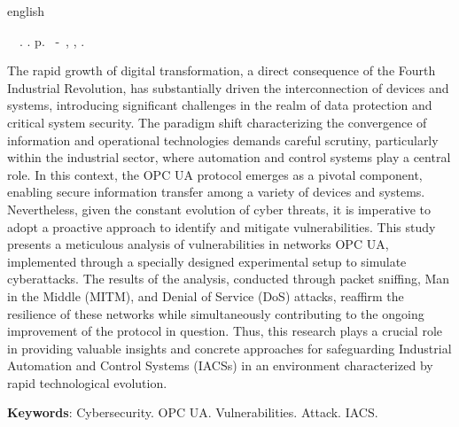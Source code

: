 \begin{resumo}[Abstract]
 \begin{otherlanguage*}{english}
	\begin{flushleft} 
		\setlength{\absparsep}{0pt} %
 		\SingleSpacing  		\imprimirautorabr~~\textbf{\imprimirtitleabstract}.	\imprimirdata.  \pageref{LastPage}p. 
		\imprimirtipotrabalhoabs~-~\imprimirinstituicao, \imprimirlocal, 	\imprimirdata. 
 	\end{flushleft}
	\OnehalfSpacing 
   The rapid growth of digital transformation, a direct consequence of the Fourth Industrial Revolution, has substantially driven the interconnection of devices and systems, introducing significant challenges in the realm of data protection and critical system security. The paradigm shift characterizing the convergence of information and operational technologies demands careful scrutiny, particularly within the industrial sector, where automation and control systems play a central role. In this context, the OPC UA protocol emerges as a pivotal component, enabling secure information transfer among a variety of devices and systems. Nevertheless, given the constant evolution of cyber threats, it is imperative to adopt a proactive approach to identify and mitigate vulnerabilities. This study presents a meticulous analysis of vulnerabilities in networks OPC UA, implemented through a specially designed experimental setup to simulate cyberattacks. The results of the analysis, conducted through packet sniffing, Man in the Middle (MITM), and Denial of Service (DoS) attacks, reaffirm the resilience of these networks while simultaneously contributing to the ongoing improvement of the protocol in question. Thus, this research plays a crucial role in providing valuable insights and concrete approaches for safeguarding Industrial Automation and Control Systems (IACSs) in an environment characterized by rapid technological evolution.

   \vspace{\onelineskip}
 
   \noindent 
   \textbf{Keywords}: Cybersecurity. OPC UA. Vulnerabilities. Attack. IACS.
 \end{otherlanguage*}
\end{resumo}
